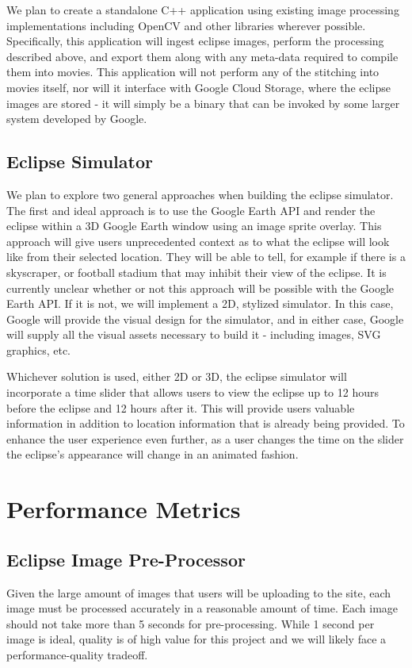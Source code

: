 \documentclass[10pt, onecolumn, draftclsnofoot, letterpaper]{IEEEtran}
\begin{document}
We plan to create a standalone C++ application using existing image processing 
implementations including OpenCV and other libraries wherever possible. 
Specifically, this application will ingest eclipse images, perform the processing 
described above, and export them along with any meta-data required to compile 
them into movies. This application will not perform any of the stitching into 
movies itself, nor will it interface with Google Cloud Storage, where the 
eclipse images are stored - it will simply be a binary that can be invoked 
by some larger system developed by Google.

\subsection{Eclipse Simulator}
We plan to explore two general approaches when building the eclipse simulator. 
The first and ideal approach is to use the Google Earth API and render the 
eclipse within a 3D Google Earth window using an image sprite overlay. This 
approach will give users unprecedented context as to what the eclipse will 
look like from their selected location. They will be able to tell, for 
example if there is a skyscraper, or football stadium that may inhibit 
their view of the eclipse. It is currently unclear whether or not this 
approach will be possible with the Google Earth API. If it is not, we 
will implement a 2D, stylized simulator. In this case, Google will 
provide the visual design for the simulator, and in either case, 
Google will supply all the visual assets necessary to build it - 
including images, SVG graphics, etc.

Whichever solution is used, either 2D or 3D, the eclipse simulator will 
incorporate a time slider that allows users to view the eclipse up to 12 hours 
before the eclipse and 12 hours after it. This will provide users valuable 
information in addition to location information that is already being provided. 
To enhance the user experience even further, as a user changes the time on the 
slider the eclipse's appearance will change in an animated fashion. 

\newpage

\section{Performance Metrics}

\subsection{Eclipse Image Pre-Processor}
Given the large amount of images that users will be uploading to the site, each 
image must be processed accurately in a reasonable amount of time. Each image 
should not take more than 5 seconds for pre-processing. While 1 second per image 
is ideal, quality is of high value for  this project and we will likely face a 
performance-quality tradeoff. 
\end{document}
